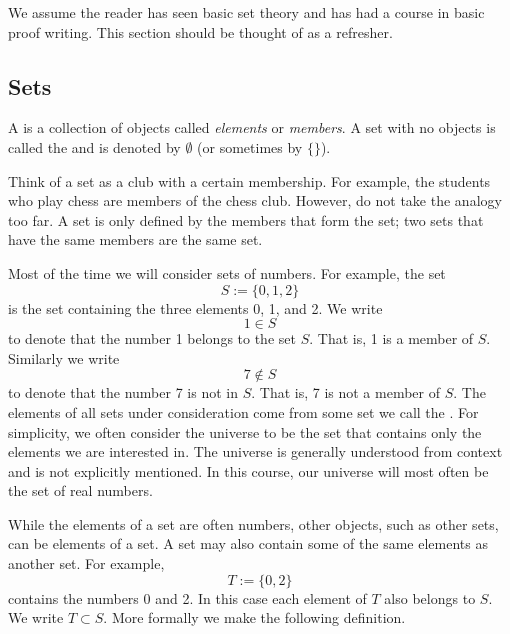 \documentclass[12pt]{book}
\begin{document}
We assume the reader has seen basic set theory
and has had a course in basic proof writing.
This section should be thought of as a refresher.

\subsection*{Sets}

A \emph{} is a collection of objects called
\emph{elements} or \emph{members}.
 A set with
no objects is called the \emph{} and is denoted by
$\emptyset$ (or sometimes by $\{ \}$).

\medskip

Think of a set as a club with a certain membership.
 For
example, the students who play chess are members of the chess club.  However,
do not take the analogy too far.
 A set is only defined by the members
that form the set; two sets that have the same members are the same set.

Most of the time we will consider sets
of numbers.
 For example, the set
\begin{equation*}
S := \{ 0, 1, 2 \}
\end{equation*}
is the set containing
the three elements 0, 1, and 2.
We write
\begin{equation*}
1 \in S
\end{equation*}
to denote that the number 1 belongs to the set $S$.
 That is, 1 is a member
of $S$.
 Similarly we write
\begin{equation*}
7 \notin S
\end{equation*}
to denote that the number 7 is not in $S$.
 That is, 7 is not a member of
$S$.
The elements of all sets under consideration come from some set we call the
\emph{}.
 For simplicity,
we often consider the universe to be the set that contains only the elements
we are interested in.
The universe is generally understood from context
and is not explicitly mentioned.
 In this course, our universe will
most often be the set of real numbers.

While the elements of a set are often numbers,
other objects, such as other sets, can be elements of a set.
A set may also contain some of the same elements as another set.
 For example,
\begin{equation*}
T := \{ 0, 2 \}
\end{equation*}
contains the numbers 0 and 2.
In this case each element of $T$ also belongs to $S$.  
We write $T \subset S$.  
More formally we make the following definition.
\end{document}

